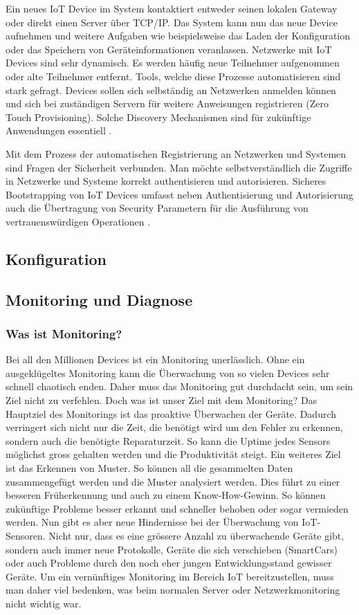 Ein neues IoT Device im System kontaktiert entweder seinen lokalen Gateway oder direkt einen Server über TCP/IP. Das System kann nun das neue Device aufnehmen und weitere Aufgaben wie beispielsweise das Laden der Konfiguration oder das Speichern von Geräteinformationen veranlassen. Netzwerke mit IoT Devices sind sehr dynamisch. Es werden häufig neue Teilnehmer aufgenommen oder alte Teilnehmer entfernt. Tools, welche diese Prozesse automatisieren sind stark gefragt. Devices sollen sich selbständig an Netzwerken anmelden können und sich bei zuständigen Servern für weitere Anweisungen registrieren (Zero Touch Provisioning). Solche Discovery Mechanismen sind für zukünftige Anwendungen essentiell \cite{IoTDiscovery10}.

Mit dem Prozess der automatischen Registrierung an Netzwerken und Systemen sind Fragen der Sicherheit verbunden. Man möchte selbstverständlich die Zugriffe in Netzwerke und Systeme korrekt authentisieren und autorisieren. Sicheres Bootstrapping von IoT Devices umfasst neben Authentisierung und Autorisierung auch die Übertragung von Security Parametern für die Ausführung von vertrauenswürdigen Operationen \cite{IoTSecurityChallenges}.
\subsection{Konfiguration}

\subsection{Monitoring und Diagnose}
\subsubsection{Was ist Monitoring?}
Bei all den Millionen Devices ist ein Monitoring unerlässlich. Ohne ein ausgeklügeltes Monitoring kann die Überwachung von so vielen Devices sehr schnell chaotisch enden. Daher muss das Monitoring gut durchdacht sein, um sein Ziel nicht zu verfehlen. Doch was ist unser Ziel mit dem Monitoring? \newline
Das Hauptziel des Monitorings ist das proaktive Überwachen der Geräte. Dadurch verringert sich nicht nur die Zeit, die benötigt wird um den Fehler zu erkennen, sondern auch die benötigte Reparaturzeit. So kann die Uptime jedes Sensors möglichst gross gehalten werden und die Produktivität steigt. Ein weiteres Ziel ist das Erkennen von Muster. So können all die gesammelten Daten zusammengefügt werden und die Muster analysiert werden. Dies führt zu einer besseren Früherkennung und auch zu einem Know-How-Gewinn. So können zukünftige Probleme besser erkannt und schneller behoben oder sogar vermieden werden.\cite{MonZiele} \newline
Nun gibt es aber neue Hindernisse bei der Überwachung von IoT-Sensoren. Nicht nur, dass es eine grössere Anzahl zu überwachende Geräte gibt, sondern auch immer neue Protokolle, Geräte die sich verschieben (SmartCars) oder auch Probleme durch den noch eher jungen Entwicklungsstand gewisser Geräte. Um ein vernünftiges Monitoring im Bereich IoT bereitzustellen, muss man daher viel bedenken, was beim normalen Server oder Netzwerkmonitoring nicht wichtig war.
